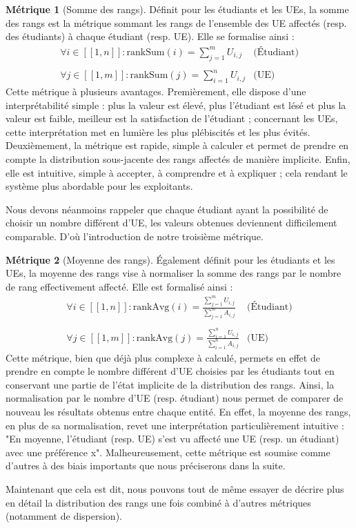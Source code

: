 \documentclass{rapport}
\theoremstyle{definition}
\theoremstyle{remark}
\theoremstyle{definition}
\newtheorem*{metric}{Métrique}
\theoremstyle{remark}
\newcommand{\llbracket}{[\![}
\newcommand{\rrbracket}{]\!]}
\begin{document}
\begin{metric}[Somme des rangs]
    Définit pour les étudiants et les UEs, la somme des rangs est la métrique sommant les rangs de l'ensemble des UE affectés (resp. des étudiants) à chaque étudiant (resp. UE).
    Elle se formalise ainsi :
    $$
    \begin{matrix}
        \forall i\in\llbracket 1, n\rrbracket : \text{rankSum}(i) = \sum_{j=1}^m U_{i,j} & \text{(Étudiant)}\\
        &\\
        \forall j\in\llbracket 1, m\rrbracket : \text{rankSum}(j) = \sum_{i=1}^n U_{i,j} & \text{(UE)}
    \end{matrix}
    $$
    Cette métrique à plusieurs avantages. Premièrement, elle dispose d'une interprétabilité simple : plus la valeur est élevé, plus l'étudiant est lésé et plus la valeur est faible, meilleur est la satisfaction de l'étudiant ; concernant les UEs, cette interprétation met en lumière les plus plébiscités et les plus évités.
    Deuxièmement, la métrique est rapide, simple à calculer et permet de prendre en compte la distribution sous-jacente des rangs affectés de manière implicite. Enfin, elle est intuitive, simple à accepter, à comprendre et à expliquer ; cela rendant le système plus abordable pour les exploitants.

    Nous devons néanmoins rappeler que chaque étudiant ayant la possibilité de choisir un nombre différent d'UE, les valeurs obtenues deviennent difficilement comparable. D'où l'introduction de notre troisième métrique.
\end{metric}
\begin{metric}[Moyenne des rangs]
    Également définit pour les étudiants et les UEs, la moyenne des rangs vise à normaliser la somme des rangs par le nombre de rang effectivement affecté. Elle est formalisé ainsi :
    $$
    \begin{matrix}
        \forall i\in\llbracket 1, n\rrbracket : \text{rankAvg}(i) = \frac{\sum_{j=1}^m U_{i,j}}{\sum_{j=1}^m A_{i,j}} & \text{(Étudiant)}\\
        &\\
        \forall j\in\llbracket 1, m\rrbracket : \text{rankAvg}(j) = \frac{\sum_{i=1}^n U_{i,j}}{\sum_{i=1}^n A_{i,j}} & \text{(UE)}
    \end{matrix}
    $$
    Cette métrique, bien que déjà plus complexe à calculé, permets en effet de prendre en compte le nombre différent d'UE choisies par les étudiants tout en conservant une partie de l'état implicite de la distribution des rangs. Ainsi, la normalisation par le nombre d'UE (resp. étudiant) nous permet de comparer de nouveau les résultats obtenus entre chaque entité.
    En effet, la moyenne des rangs, en plus de sa normalisation, revet une interprétation particulièrement intuitive : "En moyenne, l'étudiant (resp. UE) s'est vu affecté une UE (resp. un étudiant) avec une préférence x".
    Malheureusement, cette métrique est soumise comme d'autres à des biais importants que nous préciserons dans la suite.

    Maintenant que cela est dit, nous pouvons tout de même essayer de décrire plus en détail la distribution des rangs une fois combiné à d'autres métriques (notamment de dispersion).
\end{metric}
\end{document}
